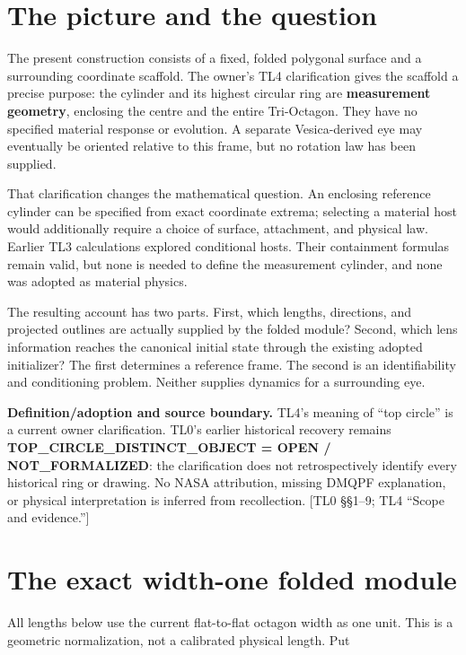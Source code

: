 \documentclass[11pt,a4paper]{article}
\begin{document}
\section{The picture and the question}

The present construction consists of a fixed, folded polygonal surface and a surrounding coordinate scaffold. The owner's TL4 clarification gives the scaffold a precise purpose: the cylinder and its highest circular ring are \textbf{measurement geometry}, enclosing the centre and the entire Tri-Octagon. They have no specified material response or evolution. A separate Vesica-derived eye may eventually be oriented relative to this frame, but no rotation law has been supplied.

That clarification changes the mathematical question. An enclosing reference cylinder can be specified from exact coordinate extrema; selecting a material host would additionally require a choice of surface, attachment, and physical law. Earlier TL3 calculations explored conditional hosts. Their containment formulas remain valid, but none is needed to define the measurement cylinder, and none was adopted as material physics.

The resulting account has two parts. First, which lengths, directions, and projected outlines are actually supplied by the folded module? Second, which lens information reaches the canonical initial state through the existing adopted initializer? The first determines a reference frame. The second is an identifiability and conditioning problem. Neither supplies dynamics for a surrounding eye.

\textbf{Definition/\allowbreak{}adoption and source boundary.} TL4's meaning of \textquotedblleft{}top circle\textquotedblright{} is a current owner clarification. TL0's earlier historical recovery remains \textbf{TOP\_\allowbreak{}CIRCLE\_\allowbreak{}DISTINCT\_\allowbreak{}OBJECT = OPEN /\allowbreak{} NOT\_\allowbreak{}FORMALIZED}: the clarification does not retrospectively identify every historical ring or drawing. No NASA attribution, missing DMQPF explanation, or physical interpretation is inferred from recollection. [TL0 \S{}\S{}1--9; TL4 \textquotedblleft{}Scope and evidence.\textquotedblright{}]

\section{The exact width-one folded module}

All lengths below use the current flat-to-flat octagon width as one unit. This is a geometric normalization, not a calibrated physical length. Put
\end{document}
